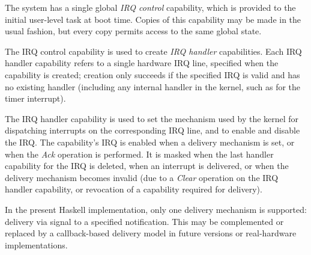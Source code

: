 The system has a single global \emph{IRQ control} capability, which is provided 
to the initial user-level task at boot time. Copies of this capability may be
made in the usual fashion, but every copy permits access to the same global
state.

The IRQ control capability is used to create \emph{IRQ handler} capabilities.
Each IRQ handler capability refers to a single hardware IRQ line, specified when 
the capability is created; creation only succeeds if the specified IRQ is valid
and has no existing handler (including any internal handler in the kernel, such
as for the timer interrupt).

The IRQ handler capability is used to set the mechanism used by the kernel for 
dispatching interrupts on the corresponding IRQ line, and to enable and disable 
the IRQ. The capability's IRQ is enabled when a delivery mechanism is set, or
when the \emph{Ack} operation is performed. It is masked when the last handler
capability for the IRQ is deleted, when an interrupt is delivered, or when the
delivery mechanism becomes invalid (due to a \emph{Clear} operation on the IRQ
handler capability, or revocation of a capability required for delivery).

In the present Haskell implementation, only one delivery mechanism is supported: 
delivery via signal to a specified notification. This may be complemented
or replaced by a callback-based delivery model in future versions or
real-hardware implementations.


